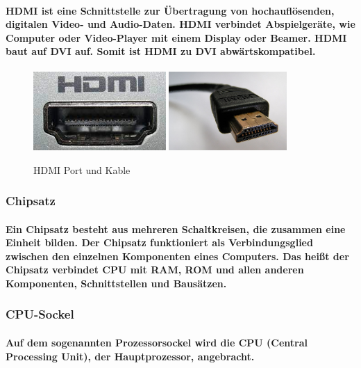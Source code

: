 \documentclass[a4paper]{article}
\begin{document}
    \paragraph{\color{codegreen}HDMI ist eine Schnittstelle zur Übertragung von hochauflösenden, digitalen Video- und Audio-Daten. HDMI verbindet Abspielgeräte, wie Computer oder Video-Player mit einem Display oder Beamer. HDMI baut auf DVI auf. Somit ist HDMI zu DVI abwärtskompatibel.}
    \begin{center}
        \begin{figure}[H]
            \centering
            \includegraphics[height=3cm]{media/hdmi}
            \includegraphics[height=3cm]{media/hdmikable}
            \captionsetup{labelformat=empty}
            \caption{HDMI Port und Kable}
            \label{fig:hdmi}
        \end{figure}
    \end{center}
    \subsubsection{\color{codegreen}Chipsatz}
    \paragraph{\color{codegreen}Ein Chipsatz besteht aus mehreren Schaltkreisen, die zusammen eine Einheit bilden. Der Chipsatz funktioniert als Verbindungsglied zwischen den einzelnen Komponenten eines Computers. Das heißt der Chipsatz verbindet CPU mit RAM, ROM und allen anderen Komponenten, Schnittstellen und Bausätzen.}
    \subsubsection{\color{codegreen}CPU-Sockel}
    \paragraph{\color{codegreen}Auf dem sogenannten Prozessorsockel wird die CPU (Central Processing Unit), der Hauptprozessor, angebracht.}
\end{document}
